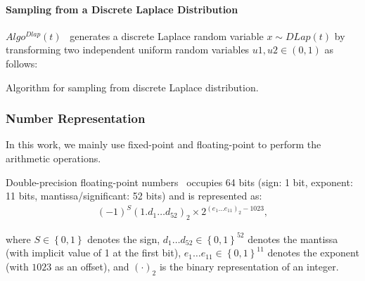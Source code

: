 \paragraph{Sampling from a Discrete Laplace Distribution}
$Algo^{Dlap}\left(t\right)$~\cite{eigner2014differentially} generates a discrete Laplace random variable $x\sim DLap\left(t\right) $ by transforming two independent uniform random variables $u1, u2 \in \left(0,1\right) $ as follows:

\begin{algorithm}[tbh!]
    \centering
    \caption{Algorithm for sampling from discrete Laplace distribution.}
    \label{algo:DiscreteLaplaceEigner}
\end{algorithm}
\FloatBarrier


\subsubsection{Number Representation}
\label{subsubsec:NumberRepresentation}
In this work, we mainly use fixed-point and floating-point to perform the arithmetic operations.

Double-precision floating-point numbers~\cite{IEEE754_2019} occupies 64 bits (sign: 1 bit, exponent: 11 bits, mantissa/significant: 52 bits) and is represented as:
\begin{equation}
    \begin{split}
        \left(-1\right)^S\left(1.d_{1}\ldots d_{52}\right)_2\times 2^{\left(e_{1}\ldots e_{11}\right)_2 -1023} ,
    \end{split}
\end{equation}

where $S\in\left\{0,1\right\} $ denotes the sign, $d_{1}\ldots d_{52} \in \left\{0,1\right\}^{52} $ denotes the mantissa (with implicit value of 1 at the first bit), $e_{1}\ldots e_{11} \in \left\{0,1\right\}^{11} $ denotes the exponent (with $1023$ as an offset), and $\left(\cdot\right)_2 $ is the binary representation of an integer.

